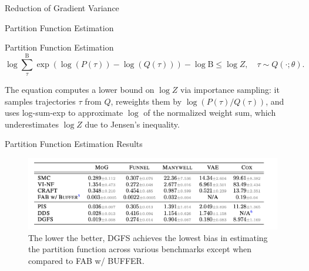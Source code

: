 \documentclass[aspectratio=169,xcolor=dvipsnames]{beamer}
\begin{document}
\begin{frame}[t]{Reduction of Gradient Variance}
\end{frame}


\begin{frame}[t]{Partition Function Estimation}
\footnotesize

\vspace{1.2cm}

\begin{block}{Partition Function Estimation}
\[
\log \sum_{\tau}^\mathrm{B} \exp(\log(P(\tau)) - \log(Q(\tau))) - \log \mathrm{B} \leq \log Z, \quad \tau \sim Q(\cdot; \theta).
\]

The equation computes a lower bound on $\log Z$ via importance sampling: it samples trajectories $\tau$ from $Q$, reweights them by $\log(P(\tau)/Q(\tau))$, and uses log-sum-exp to approximate $\log$ of the normalized weight sum, which underestimates $\log Z$ due to Jensen's inequality.

\end{block}

\end{frame}

\begin{frame}[t]{Partition Function Estimation Results}
\footnotesize

\begin{figure}
    \centering
    \includegraphics[width=1.025\textwidth]{figures/partition_fnct.png}
    \caption{The lower the better, DGFS achieves the lowest bias in estimating the partition function across various benchmarks except when compared to FAB w/ BUFFER.}
\end{figure}

\end{frame}
\end{document}
